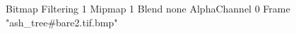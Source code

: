{Bitmap
	{Filtering 1}
	{Mipmap 1}
	{Blend none}
	{AlphaChannel 0}
	{Frame "ash_tree#bare2.tif.bmp"}
}
